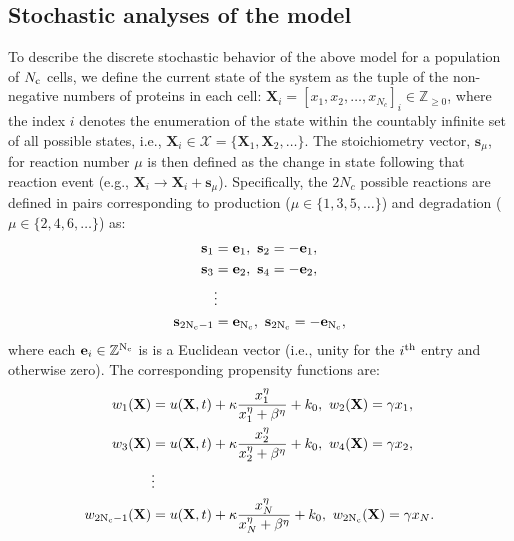 \documentclass[12pt]{iopart}
\begin{document}
\subsection{Stochastic analyses of the model}\label{sec:Stochastic}
To describe the discrete stochastic behavior of the above model for a population of $N_{\rm c}$ cells, we define the current state of the system as the tuple of the non-negative numbers of proteins in each cell: $\mathbf{X}_i = [x_{1},x_{2},\ldots,x_{N_c}]_i\in \mathbb{Z}_{\ge 0}$, where the index $i$ denotes the enumeration of the state within the countably infinite set of all possible states, i.e., $\mathbf{X}_i\in\mathcal{X}=\{\mathbf{X}_1,\mathbf{X}_2,\ldots\}$.
The stoichiometry vector, $\mathbf{s}_{\mu}$, for reaction number $\mu$ is then defined as the change in state following that reaction event (e.g., $\mathbf{X}_i \rightarrow \mathbf{X}_i + \mathbf{s}_\mu$). Specifically, the $2N_c$ possible reactions are defined in pairs corresponding to production ($\mu\in\{1,3,5,\ldots\}$) and degradation ($\mu\in\{2,4,6,\ldots\}$) as:
\begin{eqnarray}
\mathbf{s}_1 &= \mathbf{e}_1,\ \mathbf{s}_2 = -\mathbf{e}_1,\nonumber\\ 
\mathbf{s}_3 &= \mathbf{e}_2,\ \mathbf{s}_4 = -\mathbf{e}_2,\nonumber\\
&\vdots \nonumber\\ 
\mathbf{s}_{\rm 2N_c-1} &= \mathbf{e}_{\rm N_c},\ \mathbf{s}_{\rm 2N_c} = -\mathbf{e}_{\rm N_c}, \label{Stochs}
 \end{eqnarray}
where each $\mathbf{e}_{i}\in\mathbb{Z}^{{\rm N_ c}}$ is is a Euclidean vector (i.e., unity for the $i^{\rm th}$ entry and otherwise zero). The corresponding propensity functions are:
\begin{eqnarray}
w_1(\mathbf{X}) &= u(\mathbf{X},t)  + \kappa \frac{x_1^\eta}{x_1^{\eta}+\beta^{\eta}} + k_0,\ w_2(\mathbf{X}) = \gamma x_1,\nonumber\\
w_3(\mathbf{X}) &= u(\mathbf{X},t)  + \kappa \frac{x_2^\eta}{x_2^{\eta}+\beta^{\eta}} + k_0,\ w_4(\mathbf{X}) = \gamma x_2,\nonumber\\
&\vdots \nonumber\\
w_{\rm 2N_c-1}(\mathbf{X}) &= u(\mathbf{X},t)  + \kappa \frac{x_N^\eta}{x_N^{\eta}+\beta^{\eta}} + k_0,\ w_{\rm 2N_c}(\mathbf{X}) = \gamma x_N.\label{Props}
 \end{eqnarray}
\end{document}
